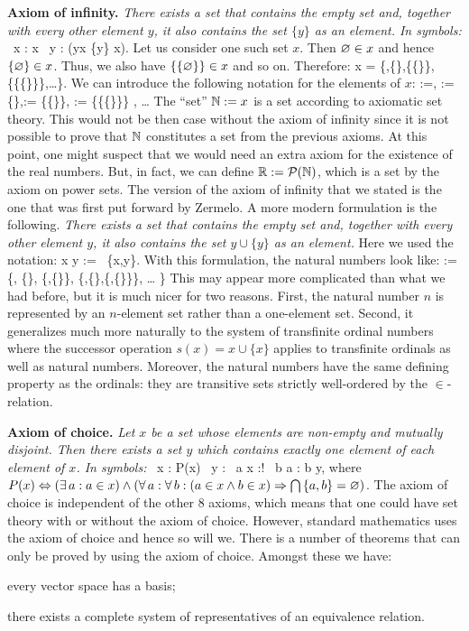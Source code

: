 \textbf{Axiom of infinity.}
\emph{There exists a set that contains the empty set and,  together with every
other element $y$, it also contains the set $\{y\}$ as an element. In
symbols:}
\bse
\exists \, x : \vn \in x \land \forall \, y : (y\in x \imp \{y\} \in x).
\ese
Let us consider one such set $x$. Then $\varnothing \in x$ and hence $\{\varnothing\}\in x$.
Thus, we also have $\{\{\varnothing\}\}\in x$ and so on. Therefore:
\bse
x = \{\vn,\{\vn\},\{\{\vn\}\},\{\{\{\vn\}\}\},\ldots\}.
\ese
We can introduce the following notation for the elements of $x$:
 :=\vn ,   := \{\vn\},:= \{\{\vn\}\}, := \{\{\{\vn\}\}\}
, \quad \ldots
\ese
\bc
The ``set'' $\mathbb{N}:=x$\index{$\N$} is a set according to axiomatic set theory.
\ec
This would not be then case without the axiom of infinity since it is not
possible to prove that $\N$ constitutes a set from the previous axioms.
\br
At this point, one might suspect that we would need an extra axiom for the
existence of the real numbers. But, in fact, we can define $\mathbb{R} := \mathcal{P}(\mathbb{N})$,
which is a set by the axiom on power sets.
\er
\br
The version of the axiom of infinity that we stated is the one that was first
put forward by Zermelo. A more modern formulation is the following.
\emph{There exists a set that contains the empty set and, together with every
other element $y$, it also contains the set $y\cup\{y\}$ as an element.} Here
we used the notation:
\bse
x \cup y := \bigcup \, \{x,y\}.
\ese
With this formulation, the natural numbers look like:
\bse
\N := \{\vn, \{\vn\}, \{\vn,\{\vn\}\}, \{\vn,\{\vn\},\{\vn,\{\vn\}\}\}, \ldots
\}
\ese
This may appear more complicated than what we had before, but it is much nicer
for two reasons.  First, the natural number $n$ is represented by an
$n$-element set rather than a one-element set. Second, it generalizes much
more naturally to the system of transfinite ordinal numbers where the
successor operation $s(x)=x\cup\{x\}$ applies to transfinite ordinals as well
as natural numbers. Moreover, the natural numbers have the same defining
property as the ordinals: they are transitive sets strictly well-ordered by
the $\in$-relation.
\er

\textbf{Axiom of choice.} \emph{Let $x$ be a set whose
elements are non-empty and mutually disjoint. Then there exists a set $y$
which contains exactly one element of each element of $x$. In symbols:}
\bse
\forall \, x : P(x) \imp \exists \, y : \forall \, a \in x :\exists! \, b \in
a : b \in y,
\ese
where $P(x) \Leftrightarrow (\exists \,a : a \in x) \land (\forall \, a : \forall \, b :
(a\in x \land b \in x) \Rightarrow \bigcap \, \{a,b\} = \varnothing )$.
\br
The axiom of choice is independent of the other 8 axioms, which means that one
could have set theory with or without the axiom of choice. However, standard
mathematics uses the axiom of choice and hence so will we. There is a number
of theorems that can only be proved by using the axiom of choice. Amongst
these we have:
\bit
\item every vector space has a basis;
\item there exists a complete system of representatives of an equivalence
relation.
\eit
\er

